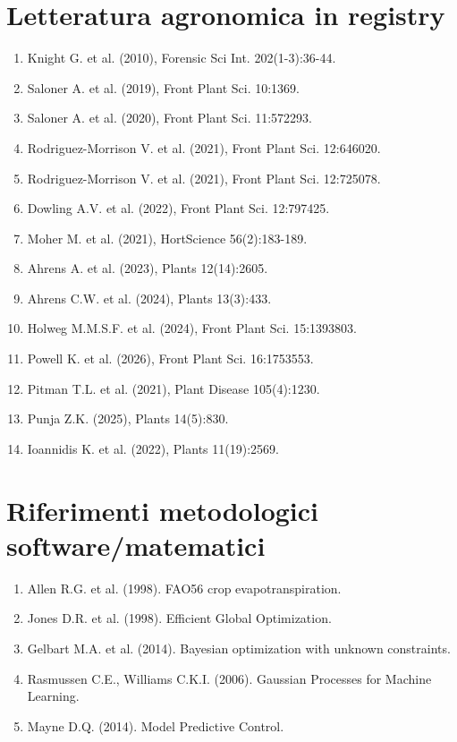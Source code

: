 ﻿\documentclass[11pt,a4paper]{report}
\begin{document}
\section{Letteratura agronomica in registry}
\begin{enumerate}
  \item Knight G. et al. (2010), Forensic Sci Int. 202(1-3):36-44.
  \item Saloner A. et al. (2019), Front Plant Sci. 10:1369.
  \item Saloner A. et al. (2020), Front Plant Sci. 11:572293.
  \item Rodriguez-Morrison V. et al. (2021), Front Plant Sci. 12:646020.
  \item Rodriguez-Morrison V. et al. (2021), Front Plant Sci. 12:725078.
  \item Dowling A.V. et al. (2022), Front Plant Sci. 12:797425.
  \item Moher M. et al. (2021), HortScience 56(2):183-189.
  \item Ahrens A. et al. (2023), Plants 12(14):2605.
  \item Ahrens C.W. et al. (2024), Plants 13(3):433.
  \item Holweg M.M.S.F. et al. (2024), Front Plant Sci. 15:1393803.
  \item Powell K. et al. (2026), Front Plant Sci. 16:1753553.
  \item Pitman T.L. et al. (2021), Plant Disease 105(4):1230.
  \item Punja Z.K. (2025), Plants 14(5):830.
  \item Ioannidis K. et al. (2022), Plants 11(19):2569.
\end{enumerate}

\section{Riferimenti metodologici software/matematici}
\begin{enumerate}
  \item Allen R.G. et al. (1998). FAO56 crop evapotranspiration.
  \item Jones D.R. et al. (1998). Efficient Global Optimization.
  \item Gelbart M.A. et al. (2014). Bayesian optimization with unknown constraints.
  \item Rasmussen C.E., Williams C.K.I. (2006). Gaussian Processes for Machine Learning.
  \item Mayne D.Q. (2014). Model Predictive Control.
\end{enumerate}
\end{document}
